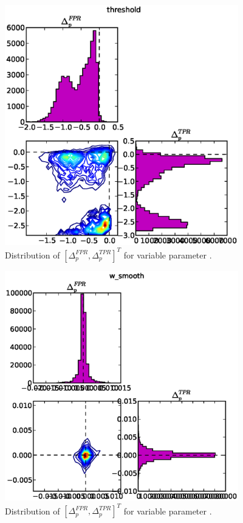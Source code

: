 \begin{figure}[!h]
\begin{center}
\includegraphics[width=4in]{../fig/final/delta_hist/threshold}
\end{center}
\caption{\label{fig:deltas3}  Distribution of $[\Delta_p^{FPR},\Delta_p^{TPR}]^T$
  for variable parameter .}
\end{figure}

\begin{figure}[!h]
\begin{center}
\includegraphics[width=4in]{../fig/final/delta_hist/w_smooth}
\end{center}
\caption{\label{fig:deltas4}  Distribution of $[\Delta_p^{FPR},\Delta_p^{TPR}]^T$
  for variable parameter .}
\end{figure}

